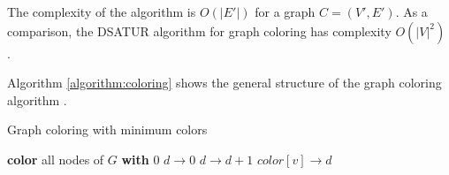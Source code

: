 The complexity of the algorithm is $O(|E'|)$ for a graph $C = (V',E')$.
As a comparison, the DSATUR algorithm for graph coloring has complexity $O(|V|^2)$ \cite{brelaz1979new}.

Algorithm \autoref{algorithm:coloring} shows the general structure of the graph coloring algorithm  \cite{mittal2011graph}.

\begin{algorithm}
\caption{Graph coloring with minimum colors}\label{algorithm:coloring}
\begin{algorithmic}[1]


\State \textbf{color} all nodes of $G$ \textbf{with} 0
\State $d \rightarrow 0$
			\State $d \rightarrow d+1$
		\EndIf
		\State $color[v] \rightarrow d$
	\EndIf
\EndFor


\EndFunction
\end{algorithmic}
\end{algorithm}


